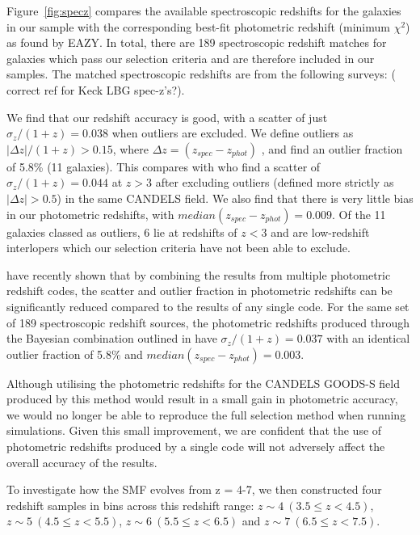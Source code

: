 Figure~\ref{fig:specz} compares the available spectroscopic redshifts for the galaxies in our sample with the corresponding best-fit photometric redshift (minimum $\chi^2$) as found by EAZY. In total, there are 189 spectroscopic redshift matches for galaxies which pass our selection criteria and are therefore included in our samples. The matched spectroscopic redshifts are from the following surveys: \citet{LeFvre:2004ge,Stanway:2004gu,Vanzella:2008hp,Hathi:2008ca,Popesso:2009ht,Wuyts:2009gv,Rhoads:2009eb,Vanzella:2009ez,Balestra:2010bt,Kurk:2012ej} (\citet{Stark:2010hv} correct ref for Keck LBG spec-z's?).

We find that our redshift accuracy is good, with a scatter of just $\sigma_{z}/(1+z) = 0.038$ when outliers are excluded. We define outliers as $\left | \Delta z \right |/(1+z) > 0.15$, where $\Delta z =  (z_{spec}-z_{phot})$ \citep{Dahlen:2013eu}, and find an outlier fraction of 5.8\% (11 galaxies). This compares with \citet{2012ApJ...756..164F} who find a scatter of $\sigma_{z}/(1+z) = 0.044$  at $z > 3$ after excluding outliers (defined more strictly as $\left | \Delta z \right | > 0.5$) in the same CANDELS field. We also find that there is very little bias in our photometric redshifts, with $median(z_{spec}-z_{phot}) = 0.009$. Of the 11 galaxies classed as outliers, 6 lie at redshifts of $z < 3$ and are low-redshift interlopers which our selection criteria have not been able to exclude.

\citet{Dahlen:2013eu} have recently shown that by combining the results from multiple photometric redshift codes, the scatter and outlier fraction in photometric redshifts can be significantly reduced compared to the results of any single code. For the same set of 189 spectroscopic redshift sources, the photometric redshifts produced through the Bayesian combination outlined in \citet{Dahlen:2013eu} have $\sigma_{z}/(1+z) = 0.037$ with an identical outlier fraction of 5.8\% and $median(z_{spec}-z_{phot}) = 0.003$. 

Although utilising the photometric redshifts for the CANDELS GOODS-S field produced by this method would result in a small gain in photometric accuracy, we would no longer be able to reproduce the full selection method when running simulations. Given this small improvement, we are confident that the use of photometric redshifts produced by a single code will not adversely affect the overall accuracy of the results.

To investigate how the SMF evolves from z = 4-7, we then constructed four redshift samples in bins across this redshift range: $z \sim 4 ~(3.5 \leq z < 4.5)$, $z \sim 5~ (4.5 \leq z < 5.5)$, $z \sim 6~(5.5 \leq z < 6.5)$ and $z \sim 7 ~(6.5 \leq z < 7.5)$.

